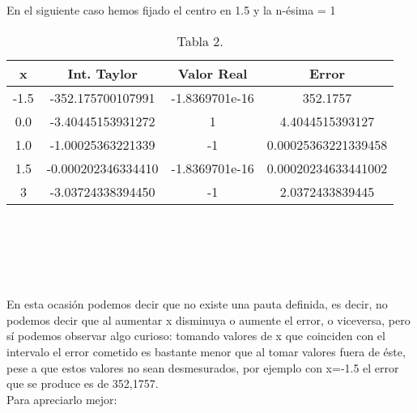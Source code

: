 \documentclass[spanish,a4paper,11pt,twoside]{report}
\begin{document}
En el siguiente caso hemos fijado el centro en 1.5 y la n-ésima =  1\\
\begin{table}[h]
    \begin{center}
	\begin{tabular}{||c|c|c|c||}
	\hline
    \hline
	x & Int. Taylor & Valor Real & Error \\
	\hline
	-1.5 & -352.175700107991 & -1.8369701e-16 & 352.1757 \\
	\hline
	0.0 & -3.40445153931272 & 1 & 4.4044515393127 \\
	\hline
	1.0 & -1.00025363221339 & -1 & 0.00025363221339458\\	
	\hline
    1.5 & -0.000202346334410 & -1.8369701e-16 & 0.00020234633441002\\
    \hline
    3 & -3.03724338394450 & -1 & 2.0372433839445\\
    \hline
    \hline
	\end{tabular}
    \end{center}
    \caption{Tabla 2.}
    \label{Tabla 2}
\end{table}\\
\begin{verbatim}




\end{verbatim}




En esta ocasión podemos decir que no existe una pauta definida, es decir, no podemos decir que al aumentar x disminuya o aumente el error, o viceversa, pero sí podemos observar algo curioso: tomando valores de x que coinciden con el intervalo el error cometido es bastante menor que al tomar valores fuera de éste, pese a que estos valores no sean desmesurados, por ejemplo con x=-1.5 el error que se produce es de 352,1757.\\
Para apreciarlo mejor:\\
\end{document}
